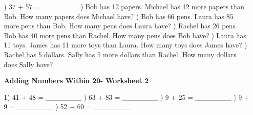 \documentclass{article}%
\begin{document}
) 37 + 57 = \_\_\_\_\_\_\_%
\newline%
\newline%
) Bob has 12 papers. Michael has 12 more papers than Bob. How many papers does Michael have?%
\newline%
\newline%
) Bob has 66 pens. Laura has 85 more pens than Bob. How many pens does Laura have?%
\newline%
\newline%
) Rachel has 26 pens. Bob has 40 more pens than Rachel. How many pens does Bob have?%
\newline%
\newline%
) Laura has 11 toys. James has 11 more toys than Laura. How many toys does James have?%
\newline%
\newline%
) Rachel has 5 dollars. Sally has 5 more dollars than Rachel. How many dollars does Sally have?%
\newline%
\newline%
\newline%
\pagebreak%
\large%
\begin{center}%
\textbf{Adding Numbers Within 20- Worksheet 2}%
\newline%
\newline%
\newline%
\end{center} \normalsize%
1) 41 + 48 = \_\_\_\_\_\_\_%
\newline%
\newline%
) 63 + 83 = \_\_\_\_\_\_\_%
\newline%
\newline%
) 9 + 25 = \_\_\_\_\_\_\_%
\newline%
\newline%
) 9 + 9 = \_\_\_\_\_\_\_%
\newline%
\newline%
) 52 + 60 = \_\_\_\_\_\_\_%
\newline%
\newline%
\end{document}
